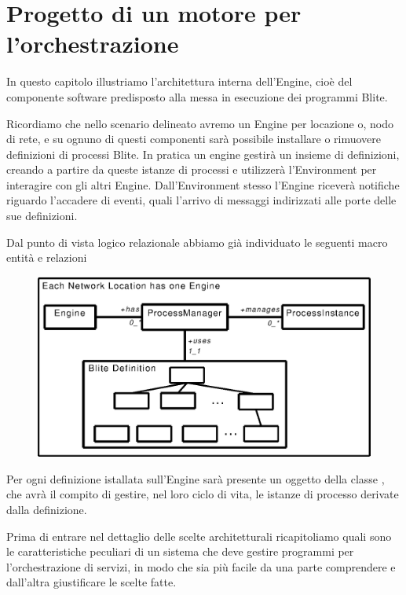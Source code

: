 \chapter{Progetto di un motore per l'orchestrazione}

In questo capitolo illustriamo l'architettura interna dell'Engine, cioè del
componente software predisposto alla messa in esecuzione dei programmi Blite.

Ricordiamo che nello scenario delineato avremo un Engine per locazione o, 
nodo di rete, e su ognuno di questi componenti sarà possibile
installare o rimuovere definizioni di processi Blite. In pratica un engine
gestir\`a un insieme di definizioni, creando a partire da queste istanze di
processi e utilizzerà l'Environment per interagire con gli altri Engine. 
Dall'Environment stesso l'Engine riceverà notifiche riguardo l'accadere di
eventi, quali l'arrivo di messaggi indirizzati alle porte delle sue definizioni.

Dal punto di vista logico relazionale abbiamo già individuato le seguenti
macro entità e relazioni

\begin{figure}[!htp]
\begin{center}
  \includegraphics{architettura_interna/dia/engine}
  \label{fig:1}
\end{center}
\end{figure}

Per ogni definizione istallata sull'Engine sarà presente un oggetto 
della classe , che avrà il compito di gestire, nel loro
ciclo di vita, le istanze di processo derivate dalla definizione.

Prima di entrare nel dettaglio delle scelte architetturali ricapitoliamo quali
sono le caratteristiche peculiari di un sistema che deve gestire programmi per
l'orchestrazione di servizi, in modo che sia pi\`u facile da una parte
comprendere e dall'altra giustificare le scelte fatte.

